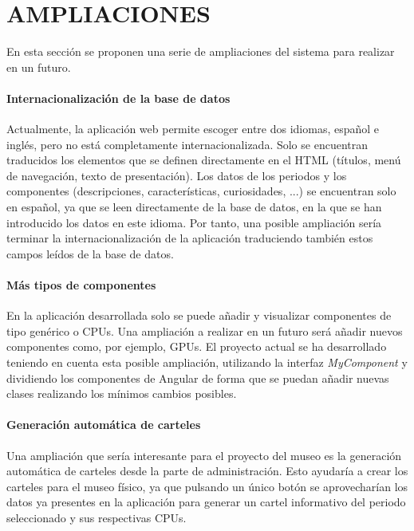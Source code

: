 \newpage
\section{AMPLIACIONES} 
En esta sección se proponen una serie de ampliaciones del sistema para realizar en un futuro.
\paragraph*{Internacionalización de la base de datos}
Actualmente, la aplicación web permite escoger entre dos idiomas, español e inglés, pero no está completamente internacionalizada. Solo se encuentran traducidos los elementos que se definen directamente en el HTML (títulos, menú de navegación, texto de presentación). Los datos de los periodos y los componentes (descripciones, características, curiosidades, ...) se encuentran solo en español, ya que se leen directamente de la base de datos, en la que se han introducido los datos en este idioma. Por tanto, una posible ampliación sería terminar la internacionalización de la aplicación traduciendo también estos campos leídos de la base de datos.

\paragraph*{Más tipos de componentes}
En la aplicación desarrollada solo se puede añadir y visualizar componentes de tipo genérico o CPUs. Una ampliación a realizar en un futuro será añadir nuevos componentes como, por ejemplo, GPUs. El proyecto actual se ha desarrollado teniendo en cuenta esta posible ampliación, utilizando la interfaz \textit{MyComponent} y dividiendo los componentes de Angular de forma que se puedan añadir nuevas clases realizando los mínimos cambios posibles.

\paragraph*{Generación automática de carteles}
Una ampliación que sería interesante para el proyecto del museo es la generación automática de carteles desde la parte de administración. Esto ayudaría a crear los carteles para el museo físico, ya que pulsando un único botón se aprovecharían los datos ya presentes en la aplicación para generar un cartel informativo del periodo seleccionado y sus respectivas CPUs.


% 
%
